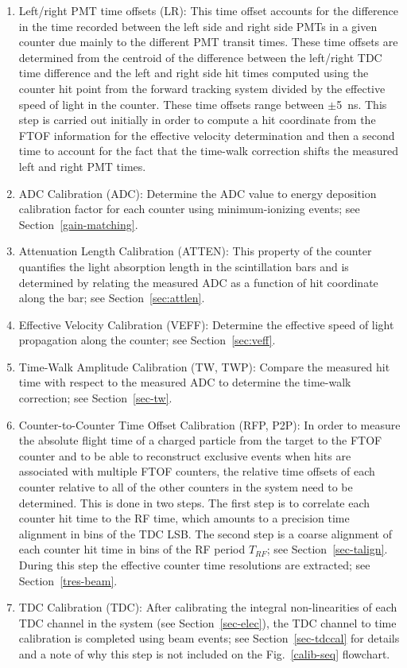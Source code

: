 \documentclass[final,3p,twocolumn]{elsarticle}
\begin{document}
\begin{enumerate}
\item Left/right PMT time offsets (LR): This time offset accounts for the difference in the time recorded
between the left side and right side PMTs in a given counter due mainly to the different PMT transit times.
These time offsets are determined from the centroid of the difference between the left/right TDC time
difference and the left and right side hit times computed using the counter hit point from the forward tracking
system divided by the effective speed of light in the counter. These time offsets range between $\pm$5~ns.
This step is carried out initially in order to compute a hit coordinate from the FTOF information for the
effective velocity determination and then a second time to account for the fact that the time-walk correction
shifts the measured left and right PMT times.

\item ADC Calibration (ADC): Determine the ADC value to energy deposition calibration factor for each counter
using minimum-ionizing events; see Section~\ref{gain-matching}.

\item Attenuation Length Calibration (ATTEN): This property of the counter quantifies the light absorption
length in the scintillation bars and is determined by relating the measured ADC as a function of hit coordinate
along the bar; see Section~\ref{sec:attlen}.

\item Effective Velocity Calibration (VEFF): Determine the effective speed of light propagation along the counter;
see Section~\ref{sec:veff}.

\item Time-Walk Amplitude Calibration (TW, TWP): Compare the measured hit time with respect to the measured
ADC to determine the time-walk correction; see Section~\ref{sec-tw}.
  
\item Counter-to-Counter Time Offset Calibration (RFP, P2P): In order to measure the absolute flight time of a
charged particle from the target to the FTOF counter and to be able to reconstruct exclusive events when hits
are associated with multiple FTOF counters, the relative time offsets of each counter relative to all of the other
counters in the system need to be determined. This is done in two steps. The first step is to correlate each counter
hit time to the RF time, which amounts to a precision time alignment in bins of the TDC LSB. The second step is a
coarse alignment of each counter hit time in bins of the RF period $T_{RF}$; see Section~\ref{sec-talign}. During
this step the effective counter time resolutions are extracted; see Section~\ref{tres-beam}.

\item TDC Calibration (TDC): After calibrating the integral non-linearities of each TDC channel in the system
(see Section~\ref{sec-elec}), the TDC channel to time calibration is completed using beam events; see
Section~\ref{sec-tdccal} for details and a note of why this step is not included on the Fig.~\ref{calib-seq}
flowchart.

\end{enumerate}
\end{document}
